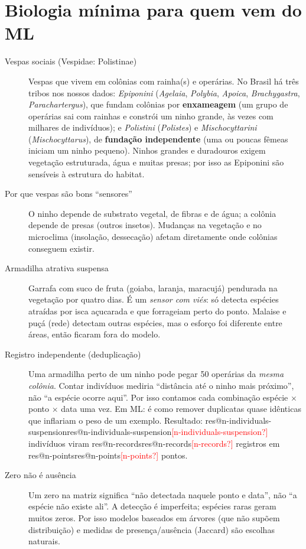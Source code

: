 \documentclass[11pt,a4paper]{article}
\makeatletter
\newcommand{\res}[1]{\ifcsname res@#1\endcsname\csname res@#1\endcsname\else\textcolor{red}{[#1?]}\fi}
\newcommand{\taxon}[1]{\textit{#1}}
\makeatother
\begin{document}
\section{Biologia mínima para quem vem do ML}

\begin{description}
\item[Vespas sociais (Vespidae: Polistinae)] Vespas que vivem em colônias com rainha(s) e
operárias. No Brasil há três tribos nos nossos dados: \emph{Epiponini} (\taxon{Agelaia},
\taxon{Polybia}, \taxon{Apoica}, \taxon{Brachygastra}, \taxon{Parachartergus}), que fundam colônias por
\textbf{enxameagem} (um grupo de operárias sai com rainhas e constrói um ninho grande, às vezes
com milhares de indivíduos); e \emph{Polistini} (\taxon{Polistes}) e \emph{Mischocyttarini}
(\taxon{Mischocyttarus}), de \textbf{fundação independente} (uma ou poucas fêmeas iniciam um ninho
pequeno). Ninhos grandes e duradouros exigem vegetação estruturada, água e muitas presas; por isso
as Epiponini são sensíveis à estrutura do habitat.

\item[Por que vespas são bons ``sensores''] O ninho depende de substrato vegetal, de fibras e de
água; a colônia depende de presas (outros insetos). Mudanças na vegetação e no microclima
(insolação, dessecação) afetam diretamente onde colônias conseguem existir.

\item[Armadilha atrativa suspensa] Garrafa com suco de fruta (goiaba, laranja, maracujá)
pendurada na vegetação por quatro dias. É um \emph{sensor com viés}: só detecta espécies
atraídas por isca açucarada e que forrageiam perto do ponto. Malaise e puçá (rede) detectam
outras espécies, mas o esforço foi diferente entre áreas, então ficaram fora do modelo.

\item[Registro independente (deduplicação)] Uma armadilha perto de um ninho pode pegar 50
operárias da \emph{mesma colônia}. Contar indivíduos mediria ``distância até o ninho mais
próximo'', não ``a espécie ocorre aqui''. Por isso contamos cada combinação espécie $\times$
ponto $\times$ data uma vez. Em ML: é como remover duplicatas quase idênticas que inflariam o
peso de um exemplo. Resultado: \res{n-individuals-suspension} indivíduos viram
\res{n-records} registros em \res{n-points} pontos.

\item[Zero não é ausência] Um zero na matriz significa ``não detectada naquele ponto e data'', não
``a espécie não existe ali''. A detecção é imperfeita; espécies raras geram muitos zeros. Por
isso modelos baseados em árvores (que não supõem distribuição) e medidas de presença/ausência
(Jaccard) são escolhas naturais.


\end{description}
\end{document}
